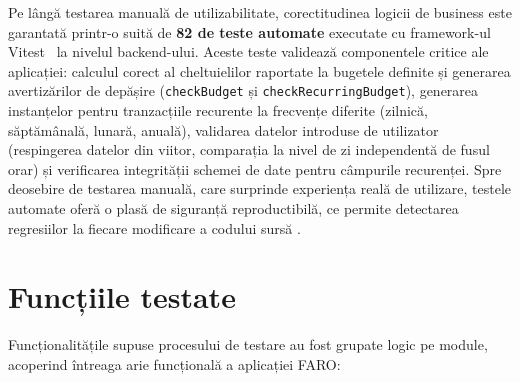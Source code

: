 \documentclass[12pt,a4paper,oneside]{report}
\begin{document}
Pe lângă testarea manuală de utilizabilitate, corectitudinea logicii de business este garantată printr-o suită de \textbf{82 de teste automate} executate cu framework-ul Vitest~\cite{ref:vitest} la nivelul backend-ului. Aceste teste validează componentele critice ale aplicației: calculul corect al cheltuielilor raportate la bugetele definite și generarea avertizărilor de depășire (\texttt{checkBudget} și \texttt{checkRecurringBudget}), generarea instanțelor pentru tranzacțiile recurente la frecvențe diferite (zilnică, săptămânală, lunară, anuală), validarea datelor introduse de utilizator (respingerea datelor din viitor, comparația la nivel de zi independentă de fusul orar) și verificarea integrității schemei de date pentru câmpurile recurenței. Spre deosebire de testarea manuală, care surprinde experiența reală de utilizare, testele automate oferă o plasă de siguranță reproductibilă, ce permite detectarea regresiilor la fiecare modificare a codului sursă \cite{ref:testing}.

\section{Funcțiile testate}

Funcționalitățile supuse procesului de testare au fost grupate logic pe module, acoperind întreaga arie funcțională a aplicației FARO:
\end{document}
